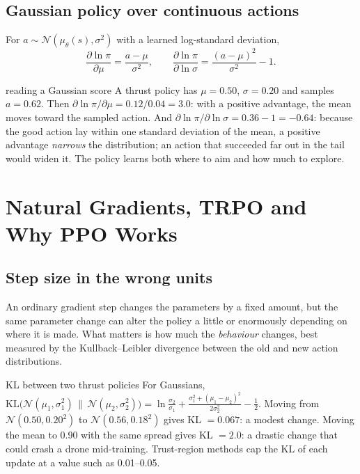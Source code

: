 \documentclass[11pt]{article}
\begin{document}
\subsection{Gaussian policy over continuous actions}
For $a\sim\mathcal N(\mu_\theta(s),\sigma^2)$ with a learned log-standard deviation,
\[\frac{\partial\ln\pi}{\partial\mu}=\frac{a-\mu}{\sigma^2},\qquad\frac{\partial\ln\pi}{\partial\ln\sigma}=\frac{(a-\mu)^2}{\sigma^2}-1.\]
\begin{example}{reading a Gaussian score}
A thrust policy has $\mu=0.50$, $\sigma=0.20$ and samples $a=0.62$. Then $\partial\ln\pi/\partial\mu=0.12/0.04=3.0$: with a positive advantage, the mean moves toward the sampled action. And $\partial\ln\pi/\partial\ln\sigma=0.36-1=-0.64$: because the good action lay within one standard deviation of the mean, a positive advantage \emph{narrows} the distribution; an action that succeeded far out in the tail would widen it. The policy learns both where to aim and how much to explore.
\end{example}

\section{Natural Gradients, TRPO and Why PPO Works}
\subsection{Step size in the wrong units}
An ordinary gradient step changes the parameters by a fixed amount, but the same parameter change can alter the policy a little or enormously depending on where it is made. What matters is how much the \emph{behaviour} changes, best measured by the Kullback--Leibler divergence between the old and new action distributions.
\begin{example}{KL between two thrust policies}
For Gaussians, $\mathrm{KL}\big(\mathcal N(\mu_1,\sigma_1^2)\,\|\,\mathcal N(\mu_2,\sigma_2^2)\big)=\ln\frac{\sigma_2}{\sigma_1}+\frac{\sigma_1^2+(\mu_1-\mu_2)^2}{2\sigma_2^2}-\frac12$. Moving from $\mathcal N(0.50,0.20^2)$ to $\mathcal N(0.56,0.18^2)$ gives KL $=0.067$: a modest change. Moving the mean to 0.90 with the same spread gives KL $=2.0$: a drastic change that could crash a drone mid-training. Trust-region methods cap the KL of each update at a value such as 0.01--0.05.
\end{example}
\end{document}
